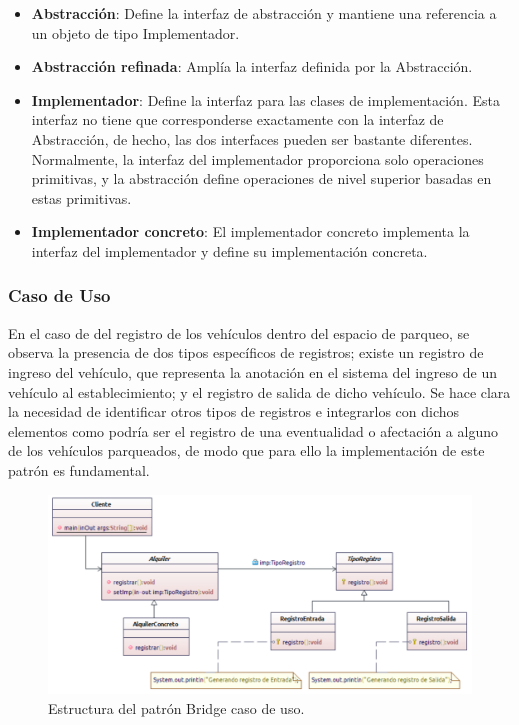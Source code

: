 \begin{itemize}
	\item \textbf{Abstracción}: Define la interfaz de abstracción y mantiene una referencia a un objeto de tipo Implementador.
	\item \textbf{Abstracción refinada}: Amplía la interfaz definida por la Abstracción.
	\item \textbf{Implementador}: Define la interfaz para las clases de implementación. Esta interfaz no tiene que corresponderse exactamente con la interfaz de Abstracción, de hecho, las dos interfaces pueden ser bastante diferentes. Normalmente, la interfaz del implementador proporciona solo operaciones primitivas, y la abstracción define operaciones de nivel superior basadas en estas primitivas.
	\item \textbf{Implementador concreto}: El implementador concreto implementa la interfaz del implementador y define su implementación concreta.
\end{itemize}


\subsubsection{Caso de Uso}
En el caso de del registro de los vehículos dentro del espacio de parqueo, se observa la presencia de dos tipos específicos de registros; existe un registro de ingreso del vehículo, que representa la anotación en el sistema del ingreso de un vehículo al establecimiento; y el registro de salida de dicho vehículo.
Se hace clara la necesidad de identificar otros tipos de registros e integrarlos con dichos elementos como podría ser el registro de una eventualidad o afectación a alguno de los vehículos parqueados, de modo que para ello la implementación de este patrón es fundamental.

\begin{figure}[th!]
	\centering
	\includegraphics[width=.7\linewidth]{imagenes/Patrones/Bridge_caso.pdf}
	\caption{Estructura del patrón Bridge caso de uso.\cite{gof}}	
\end{figure}

